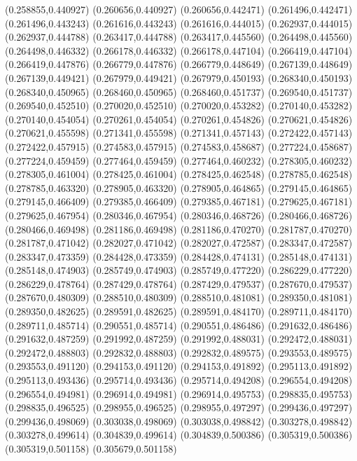 (0.258855,0.440927)
(0.260656,0.440927)
(0.260656,0.442471)
(0.261496,0.442471)
(0.261496,0.443243)
(0.261616,0.443243)
(0.261616,0.444015)
(0.262937,0.444015)
(0.262937,0.444788)
(0.263417,0.444788)
(0.263417,0.445560)
(0.264498,0.445560)
(0.264498,0.446332)
(0.266178,0.446332)
(0.266178,0.447104)
(0.266419,0.447104)
(0.266419,0.447876)
(0.266779,0.447876)
(0.266779,0.448649)
(0.267139,0.448649)
(0.267139,0.449421)
(0.267979,0.449421)
(0.267979,0.450193)
(0.268340,0.450193)
(0.268340,0.450965)
(0.268460,0.450965)
(0.268460,0.451737)
(0.269540,0.451737)
(0.269540,0.452510)
(0.270020,0.452510)
(0.270020,0.453282)
(0.270140,0.453282)
(0.270140,0.454054)
(0.270261,0.454054)
(0.270261,0.454826)
(0.270621,0.454826)
(0.270621,0.455598)
(0.271341,0.455598)
(0.271341,0.457143)
(0.272422,0.457143)
(0.272422,0.457915)
(0.274583,0.457915)
(0.274583,0.458687)
(0.277224,0.458687)
(0.277224,0.459459)
(0.277464,0.459459)
(0.277464,0.460232)
(0.278305,0.460232)
(0.278305,0.461004)
(0.278425,0.461004)
(0.278425,0.462548)
(0.278785,0.462548)
(0.278785,0.463320)
(0.278905,0.463320)
(0.278905,0.464865)
(0.279145,0.464865)
(0.279145,0.466409)
(0.279385,0.466409)
(0.279385,0.467181)
(0.279625,0.467181)
(0.279625,0.467954)
(0.280346,0.467954)
(0.280346,0.468726)
(0.280466,0.468726)
(0.280466,0.469498)
(0.281186,0.469498)
(0.281186,0.470270)
(0.281787,0.470270)
(0.281787,0.471042)
(0.282027,0.471042)
(0.282027,0.472587)
(0.283347,0.472587)
(0.283347,0.473359)
(0.284428,0.473359)
(0.284428,0.474131)
(0.285148,0.474131)
(0.285148,0.474903)
(0.285749,0.474903)
(0.285749,0.477220)
(0.286229,0.477220)
(0.286229,0.478764)
(0.287429,0.478764)
(0.287429,0.479537)
(0.287670,0.479537)
(0.287670,0.480309)
(0.288510,0.480309)
(0.288510,0.481081)
(0.289350,0.481081)
(0.289350,0.482625)
(0.289591,0.482625)
(0.289591,0.484170)
(0.289711,0.484170)
(0.289711,0.485714)
(0.290551,0.485714)
(0.290551,0.486486)
(0.291632,0.486486)
(0.291632,0.487259)
(0.291992,0.487259)
(0.291992,0.488031)
(0.292472,0.488031)
(0.292472,0.488803)
(0.292832,0.488803)
(0.292832,0.489575)
(0.293553,0.489575)
(0.293553,0.491120)
(0.294153,0.491120)
(0.294153,0.491892)
(0.295113,0.491892)
(0.295113,0.493436)
(0.295714,0.493436)
(0.295714,0.494208)
(0.296554,0.494208)
(0.296554,0.494981)
(0.296914,0.494981)
(0.296914,0.495753)
(0.298835,0.495753)
(0.298835,0.496525)
(0.298955,0.496525)
(0.298955,0.497297)
(0.299436,0.497297)
(0.299436,0.498069)
(0.303038,0.498069)
(0.303038,0.498842)
(0.303278,0.498842)
(0.303278,0.499614)
(0.304839,0.499614)
(0.304839,0.500386)
(0.305319,0.500386)
(0.305319,0.501158)
(0.305679,0.501158)
